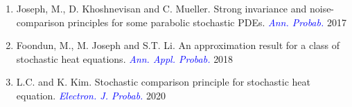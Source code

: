 \documentclass[9pt,table,xcolor=dvipsnames]{beamer}%
\theoremstyle{definition}
\theoremstyle{plain}
\begin{document}
\begin{frame}
\begin{enumerate}
  \item \textcolor{yellow!75!black}{Joseph, M.}, \textcolor{yellow!75!black}{D. Khoshnevisan} and \textcolor{yellow!75!black}{C. Mueller}. Strong invariance and noise-comparison principles for some parabolic stochastic PDEs.           \textcolor{blue}{ \it Ann. Probab.                            }2017
  \item \textcolor{yellow!75!black}{Foondun, M.}, \textcolor{yellow!75!black}{M. Joseph} and \textcolor{yellow!75!black}{S.T. Li}. An approximation result for a class of stochastic heat equations.                                       \textcolor{blue}{ \it Ann. Appl. Probab.                      }2018
  \item[\textcolor{magenta}{\bf 5.}] \textcolor{yellow!75!black}{L.C.} and \textcolor{yellow!75!black}{K. Kim.} Stochastic comparison principle for stochastic heat equation.                                                     \textcolor{blue}{ \it Electron. J. Probab.                    }2020
\end{enumerate}
\end{frame}
\end{document}
